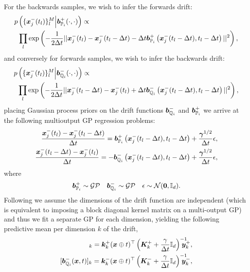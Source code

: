 \documentclass[a4paper,12pt,twoside,openright]{report}
\theoremstyle{definition}
\begin{document}
For the backwards samples, we wish to infer the forwards drift:
\begin{align*}
    p&\left(\{{\bm{x}}^{-}_j(t_l)\}_{l}^M \Big| {\bm{b}}^{+}_{{\mathbb{P}}_{i}}(\cdot, \cdot)\right) \propto\\
    &\prod_l \exp \left( -\frac{1}{2\Delta t} ||{\bm{x}}^{-}_j(t_l) - {\bm{x}}^{-}_j(t_l - \Delta t) -  \Delta t{\bm{b}}^{+}_{{\mathbb{P}}_{i}}\left({\bm{x}}^{-}_j(t_l - \Delta t), t_l - \Delta t\right) ||^2 \right), 
\end{align*}
and conversely for forwards samples, we wish to infer the backwards drift:
\begin{align*}
    p&\left(\{{\bm{x}}^{-}_j(t_l)\}_{l}^M \Big| {\bm{b}}^{-}_{{\mathbb{Q}}_{i}}(\cdot, \cdot)\right) \propto\\
    &\prod_l \exp \left( -\frac{1}{2\Delta t} ||{\bm{x}}^{-}_j(t_l - \Delta t)  - {\bm{x}}^{-}_j(t_l)  +  \Delta t{\bm{b}}^{-}_{{\mathbb{Q}}_{i}}\left({\bm{x}}^{-}_j(t_l - \Delta t), t_l - \Delta t\right) ||^2 \right), 
\end{align*}
placing Gaussian process priors on the drift functions ${\bm{b}}^{-}_{{\mathbb{Q}}_{i}}$ and ${\bm{b}}^{+}_{{\mathbb{P}}_{i}}$ we arrive at the following multioutput GP regression problems:
\begin{align*}
        \frac{{\bm{x}}^{-}_j(t_l) - {\bm{x}}^{-}_j(t_l - \Delta t)}{\Delta t} = {\bm{b}}^{+}_{{\mathbb{P}}_{i}}\left({\bm{x}}^{-}_j(t_l - \Delta t), t_l - \Delta t\right) +\frac{\bm{\gamma}^{1/2}}{\Delta t}\epsilon ,\\
        \frac{{\bm{x}}^{-}_j(t_l - \Delta t)  - {\bm{x}}^{-}_j(t_l)}{\Delta t}  = -{\bm{b}}^{-}_{{\mathbb{Q}}_{i}}\left({\bm{x}}^{-}_j(t_l - \Delta t), t_l - \Delta t\right) +\frac{\bm{\gamma}^{1/2}}{\Delta t}\epsilon,
\end{align*}
where
\begin{align}
   {\bm{b}}^{+}_{{\mathbb{P}}_{i}} \sim \mathcal{GP} \quad {\bm{b}}^{-}_{{\mathbb{Q}}_{i}} \sim \mathcal{GP}\quad \epsilon \sim {\mathcal{N}}({\bm{0}}, {\mathbb{I}_d}).
\end{align}
Following \citep{ruttor2013approximate, batz2018approximate} we assume the dimensions of the drift function are independent (which is equivalent to imposing a block diagonal kernel matrix on a multi-output GP) and thus we fit a separate GP for each dimension, yielding the following predictive mean per dimension $k$ of the drift,
\begin{align}
[\bar{\vb}^{+}_{\P_{i}}(\vx, t)]_k = \vk_k^{+}(\vx \oplus t)^{\top} \left(\mK_k^{+} + \frac{\gamma}{\Delta t} \I\right)^{-1}\!\!\!\!\!\!\vy_k^{+}, \\
[\vb^{-}_{\Q_{i}}(\vx, t)]_k = \vk_k^{-}(\vx \oplus t)^{\top} \left(\mK_k^{-} + \frac{\gamma}{\Delta t} \I\right)^{-1}\!\!\!\!\!\!\vy_k^{-} ,
\end{align}
\end{document}
